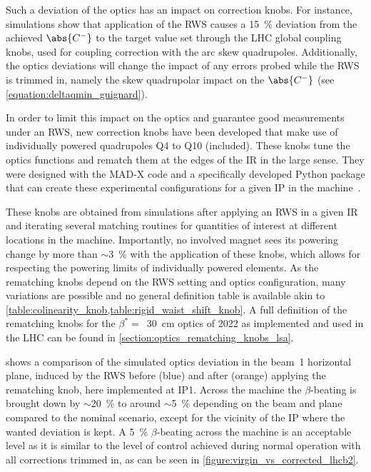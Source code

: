 Such a deviation of the optics has an impact on correction knobs.
For instance, simulations show that application of the RWS causes a \qty{15}{\percent} deviation from the achieved \(\abs{C^{-}}\) to the target value set through the LHC global coupling knobs, used for coupling correction with the arc skew quadrupoles.
Additionally, the optics deviations will change the impact of any errors probed while the RWS is trimmed in, namely the skew quadrupolar impact on the \(\abs{C^{-}}\) (see \cref{equation:deltaqmin_guignard}).
\newline

In order to limit this impact on the optics and guarantee good measurements under an RWS, new correction knobs have been developed that make use of individually powered quadrupoles Q\num{4} to Q\num{10} (included). 
These knobs tune the optics functions and rematch them at the edges of the IR in the large sense.
They were designed with the MAD-X code and a specifically developed Python package that can create these experimental configurations for a given IP in the machine~\cite{CODE:Soubelet:pyrws}.

These knobs are obtained from simulations after applying an RWS in a given IR and iterating several matching routines for quantities of interest at different locations in the machine.
Importantly, no involved magnet sees its powering change by more than \(\sim\)\qty{3}{\percent} with the application of these knobs, which allows for respecting the powering limits of individually powered elements.
As the rematching knobs depend on the RWS setting and optics configuration, many variations are possible and no general definition table is available akin to \cref{table:colinearity_knob,table:rigid_waist_shift_knob}.
A full definition of the rematching knobs for the \(\beta^{\ast} =\)~\qty{30}{\centi\meter} optics of 2022 as implemented and used in the LHC can be found in \cref{section:optics_rematching_knobs_lsa}.

 shows a comparison of the simulated optics deviation in the beam~\num{1} horizontal plane, induced by the RWS before (\textcolor{mplblue}{blue}) and after (\textcolor{mplorange}{orange}) applying the rematching knob, here implemented at IP\num{1}.
Across the machine the \(\beta\)-beating is brought down by \(\sim\)\qty{20}{\percent} to around \(\sim\)\qty{5}{\percent} depending on the beam and plane compared to the nominal scenario, except for the vicinity of the IP where the wanted deviation is kept.
A \qty{5}{\percent} \(\beta\)-beating across the machine is an acceptable level as it is similar to the level of control achieved during normal operation with all corrections trimmed in, as can be seen in \cref{figure:virgin_vs_corrected_lhcb2}.

